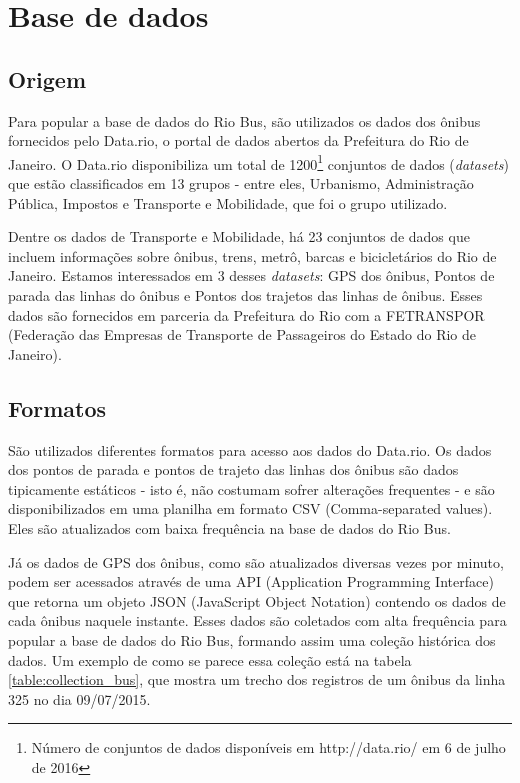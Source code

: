 \section{Base de dados}

\subsection{Origem}

Para popular a base de dados do Rio Bus, são utilizados os dados dos ônibus fornecidos pelo Data.rio\cite{data.rio}, o portal de dados abertos da Prefeitura do Rio de Janeiro. O Data.rio disponibiliza um total de 1200\footnote{Número de conjuntos de dados disponíveis em http://data.rio/ em 6 de julho de 2016} conjuntos de dados (\textit{datasets}) que estão classificados em 13 grupos - entre eles, Urbanismo, Administração Pública, Impostos e Transporte e Mobilidade, que foi o grupo utilizado.

Dentre os dados de Transporte e Mobilidade, há 23 conjuntos de dados que incluem informações sobre ônibus, trens, metrô, barcas e bicicletários do Rio de Janeiro. Estamos interessados em 3 desses \textit{datasets}: GPS dos ônibus, Pontos de parada das linhas do ônibus e Pontos dos trajetos das linhas de ônibus. Esses dados são fornecidos em parceria da Prefeitura do Rio com a FETRANSPOR (Federação das Empresas de Transporte de Passageiros do Estado do Rio de Janeiro).


\subsection{Formatos}

São utilizados diferentes formatos para acesso aos dados do Data.rio. Os dados dos pontos de parada e pontos de trajeto das linhas dos ônibus são dados tipicamente estáticos - isto é, não costumam sofrer alterações frequentes - e são disponibilizados em uma planilha em formato CSV (Comma-separated values). Eles são atualizados com baixa frequência na base de dados do Rio Bus.

Já os dados de GPS dos ônibus, como são atualizados diversas vezes por minuto, podem ser acessados através de uma API (Application Programming Interface) que retorna um objeto JSON (JavaScript Object Notation) contendo os dados de cada ônibus naquele instante. Esses dados são coletados com alta frequência para popular a base de dados do Rio Bus, formando assim uma coleção histórica dos dados. Um exemplo de como se parece essa coleção está na tabela \ref{table:collection_bus}, que mostra um trecho dos registros de um ônibus da linha 325 no dia 09/07/2015.

